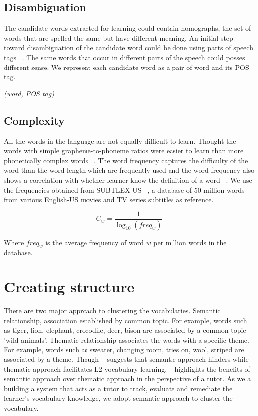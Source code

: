 \documentclass[11pt,a4paper]{article}
\begin{document}
\subsection{Disambiguation}
The candidate words extracted for learning could contain homographs, the set of words that are spelled the same but have different meaning. An initial step toward disambiguation of the candidate word could be done using parts of speech tags ~\cite{wilks1998grammar}. The same words that occur in different parts of the speech could posses different sense. We represent each candidate word as a pair of word and its POS tag.

\begin{center}\emph{(word, POS tag)}\end{center}

\subsection{Complexity}
All the words in the language are not equally difficult to learn. 
Thought the words with simple grapheme-to-phoneme ratios
were easier to learn than more phonetically complex words ~\cite{rosa2011effect}. The word frequency captures the difficulty of the word than the word length which are frequently used and the word frequency also shows a correlation with whether learner know the definition of a word ~\cite{leroy2013effect}. We use the frequencies obtained from SUBTLEX-US ~\cite{brysbaert2009moving}, a database of 50 million words from various English-US movies and TV series subtitles as reference.

\begin{equation}
  C_w = \frac{1}{\log_{10}(freq_w)}
\end{equation}

Where ${freq_w}$ is the average frequency of word $w$ per million words in the database.

\section{Creating structure}
There are two major approach to clustering the vocabularies. Semantic relationship, association established by common topic. For example, words such as tiger, lion, elephant, crocodile, deer, bison are associated by a common topic 'wild animals'. Thematic relationship associates the words with a specific theme. For example, words such as sweater, changing room, tries on, wool, striped are associated by a theme. Though ~\cite{tinkham1997effects} suggests that semantic approach hinders while thematic approach facilitates L2 vocabulary learning. ~\cite{gholami2014semantic} highlights the benefits of semantic approach over thematic approach in the perspective of a tutor. As we a building a system that acts as a tutor to track, evaluate and remediate the learner's vocabulary knowledge, we adopt semantic approach to cluster the vocabulary.
\end{document}
